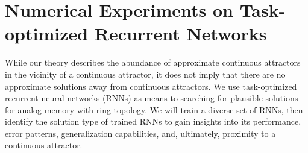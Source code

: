 \documentclass{article} %
\newcommand{\mpcomment}[1]{\textcolor{mpcolor}{(#1)}}
\newcounter{ct}
\theoremstyle{definition}
\theoremstyle{remark}
\begin{document}

\section{Numerical Experiments on Task-optimized Recurrent Networks}\label{sec:experiments}

While our theory describes the abundance of approximate continuous attractors in the vicinity of a continuous attractor, it does not imply that there are no approximate solutions away from continuous attractors.
We use task-optimized recurrent neural networks (RNNs) as means to searching for plausible solutions for analog memory with ring topology.
We will train a diverse set of RNNs, then identify the solution type of trained RNNs to gain insights into its performance, error patterns, generalization capabilities, and, ultimately, proximity to a continuous attractor.
\end{document}
